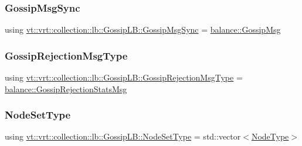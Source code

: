 \subsubsection{\texorpdfstring{Gossip\+Msg\+Sync}{GossipMsgSync}}
{\footnotesize\ttfamily using \hyperlink{structvt_1_1vrt_1_1collection_1_1lb_1_1_gossip_l_b_a39aebe4c174695c551b5b9a907bac615}{vt\+::vrt\+::collection\+::lb\+::\+Gossip\+L\+B\+::\+Gossip\+Msg\+Sync} =  \hyperlink{structvt_1_1vrt_1_1collection_1_1balance_1_1_gossip_msg}{balance\+::\+Gossip\+Msg}}

\mbox{\label{structvt_1_1vrt_1_1collection_1_1lb_1_1_gossip_l_b_aca0c34945e33ca19b88af98ca8a6f062}} 
\subsubsection{\texorpdfstring{Gossip\+Rejection\+Msg\+Type}{GossipRejectionMsgType}}
{\footnotesize\ttfamily using \hyperlink{structvt_1_1vrt_1_1collection_1_1lb_1_1_gossip_l_b_aca0c34945e33ca19b88af98ca8a6f062}{vt\+::vrt\+::collection\+::lb\+::\+Gossip\+L\+B\+::\+Gossip\+Rejection\+Msg\+Type} =  \hyperlink{structvt_1_1vrt_1_1collection_1_1balance_1_1_gossip_rejection_stats_msg}{balance\+::\+Gossip\+Rejection\+Stats\+Msg}}

\mbox{\label{structvt_1_1vrt_1_1collection_1_1lb_1_1_gossip_l_b_abb53f1d4bd3c37f3e68c3b5b0e1f1c86}} 
\subsubsection{\texorpdfstring{Node\+Set\+Type}{NodeSetType}}
{\footnotesize\ttfamily using \hyperlink{structvt_1_1vrt_1_1collection_1_1lb_1_1_gossip_l_b_abb53f1d4bd3c37f3e68c3b5b0e1f1c86}{vt\+::vrt\+::collection\+::lb\+::\+Gossip\+L\+B\+::\+Node\+Set\+Type} =  std\+::vector$<$\hyperlink{namespacevt_a866da9d0efc19c0a1ce79e9e492f47e2}{Node\+Type}$>$}

